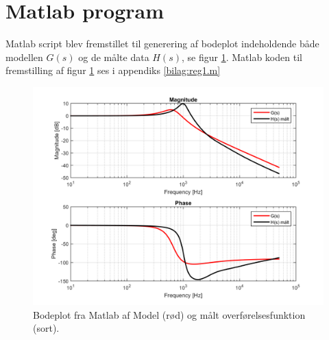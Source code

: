 \section{Matlab program}\label{sec:spm3}
Matlab script blev fremstillet til generering af bodeplot indeholdende både modellen $G(s)$ og de målte data $H(s)$, se figur \ref{fig:bodeplot}.
Matlab koden til fremstilling af figur \ref{fig:bodeplot} ses i appendiks \ref{bilag:reg1.m}
\begin{figure}[h!]
	\centering
	\includegraphics[width=.8\textwidth]{bodeplot.png}
	\caption{Bodeplot fra Matlab af Model (rød) og målt overførelsesfunktion (sort).}
	\label{fig:bodeplot}
\end{figure}
\FloatBlock

